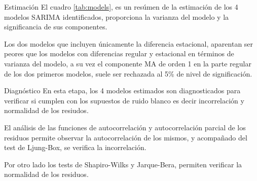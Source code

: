 \documentclass[
  ignorenonframetext,
]{beamer}
\begin{document}
\begin{frame}{Estimación}
\protect\hypertarget{estimaciuxf3n}{}
El cuadro \ref{tab:models}, es un resúmen de la estimación de los 4
modelos SARIMA identificados, proporciona la varianza del modelo y la
significancia de sus componentes.

\begin{table}[H]
\centering
{}
\caption{Estimación de modelos SARIMA.}
\label{tab:models}
\end{table}

Los dos modelos que incluyen únicamente la diferencia estacional,
aparentan ser peores que los modelos con diferencias regular y
estacional en términos de varianza del modelo, a su vez el componente MA
de orden 1 en la parte regular de los dos primeros modelos, suele ser
rechazada al 5\% de nivel de significación.
\end{frame}

\begin{frame}{Diagnóstico}
\protect\hypertarget{diagnuxf3stico}{}
En esta etapa, los 4 modelos estimados son diagnosticados para verificar
si cumplen con los supuestos de ruido blanco es decir incorrelación y
normalidad de los resiudos.

El análisis de las funciones de autocorrelación y autocorrelación
parcial de los residuos permite observar la autocorrelación de los
mismos, y acompañado del test de Ljung-Box, se verifica la
incorrelación.

Por otro lado los tests de Shapiro-Wilks y Jarque-Bera, permiten
verificar la normalidad de los residuos.
\end{frame}
\end{document}
